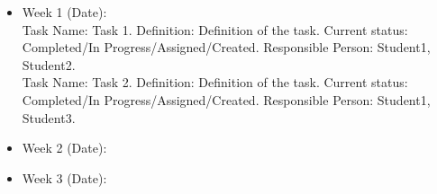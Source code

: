 \documentclass[14pt]{article}
\begin{document}
\begin{itemize}
    \item{Week 1 (Date):}\\ Task Name: Task 1. Definition: Definition of the task. Current status: Completed/In Progress/Assigned/Created. Responsible Person: Student1, Student2.\\
    Task Name: Task 2. Definition: Definition of the task. Current status: Completed/In Progress/Assigned/Created. Responsible Person: Student1, Student3.
\end{itemize}

\begin{itemize}
    \item{Week 2 (Date):}
\end{itemize}

\begin{itemize}
    \item{Week 3 (Date):}
\end{itemize}
\end{document}
